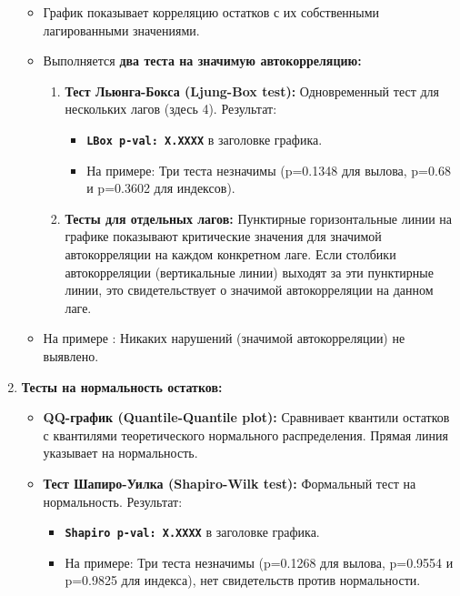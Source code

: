 \documentclass[
  letterpaper,
  DIV=11,
  numbers=noendperiod]{scrreprt}
\begin{document}
\begin{enumerate}
  \begin{itemize}
  \item
    График показывает корреляцию остатков с их собственными
    лагированными значениями.
  \item
    Выполняется \textbf{два теста на значимую автокорреляцию:}

    \begin{enumerate}
    \def\labelenumii{\arabic{enumii}.}
    \item
      \textbf{Тест Льюнга-Бокса (Ljung-Box test):} Одновременный тест
      для нескольких лагов (здесь 4). Результат:

      \begin{itemize}
      \item
        \textbf{\texttt{LBox\ p-val:\ X.XXXX}} в заголовке графика.
      \item
        На примере: Три теста незначимы (p=0.1348 для вылова, p=0.68 и
        p=0.3602 для индексов).
      \end{itemize}
    \item
      \textbf{Тесты для отдельных лагов:} Пунктирные горизонтальные
      линии на графике показывают критические значения для значимой
      автокорреляции на каждом конкретном лаге. Если столбики
      автокорреляции (вертикальные линии) выходят за эти пунктирные
      линии, это свидетельствует о значимой автокорреляции на данном
      лаге.
    \end{enumerate}
  \item
    На примере : Никаких нарушений (значимой автокорреляции) не
    выявлено.
  \end{itemize}
\item
  \textbf{Тесты на нормальность остатков:}

  \begin{itemize}
  \item
    \textbf{QQ-график (Quantile-Quantile plot):} Сравнивает квантили
    остатков с квантилями теоретического нормального распределения.
    Прямая линия указывает на нормальность.
  \item
    \textbf{Тест Шапиро-Уилка (Shapiro-Wilk test):} Формальный тест на
    нормальность. Результат:

    \begin{itemize}
    \item
      \textbf{\texttt{Shapiro\ p-val:\ X.XXXX}} в заголовке графика.
    \item
      На примере: Три теста незначимы (p=0.1268 для вылова, p=0.9554 и
      p=0.9825 для индекса), нет свидетельств против нормальности.
    \end{itemize}
  \end{itemize}
\end{enumerate}
\end{document}

